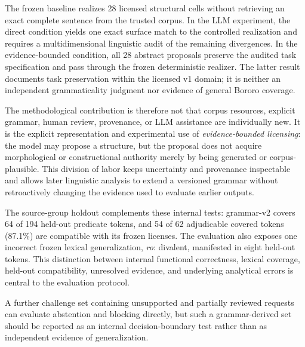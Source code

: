 \documentclass[11pt]{article}
\begin{document}
The frozen baseline realizes 28 licensed structural cells without retrieving an
exact complete sentence from the trusted corpus. In the LLM experiment, the
direct condition yields one exact surface match to the controlled realization
and requires a multidimensional linguistic audit of the remaining divergences.
In the evidence-bounded condition, all 28 abstract proposals preserve the
audited task specification and pass through the frozen deterministic realizer.
The latter result documents task preservation within the licensed v1 domain;
it is neither an independent grammaticality judgment nor evidence of general
Bororo coverage.

The methodological contribution is therefore not that corpus resources,
explicit grammar, human review, provenance, or LLM assistance are individually
new. It is the explicit representation and experimental use of
\emph{evidence-bounded licensing}: the model may propose a structure, but the
proposal does not acquire morphological or constructional authority merely by
being generated or corpus-plausible. This division of labor keeps uncertainty
and provenance inspectable and allows later linguistic analysis to extend a
versioned grammar without retroactively changing the evidence used to evaluate
earlier outputs.

The source-group holdout complements these internal tests: grammar-v2 covers
64 of 194 held-out predicate tokens, and 54 of 62 adjudicable covered tokens
(87.1\%) are compatible with its frozen licenses. The evaluation also exposes
one incorrect frozen lexical generalization, \textit{ro}: divalent, manifested
in eight held-out tokens. This distinction between internal functional
correctness, lexical coverage, held-out compatibility, unresolved evidence, and
underlying analytical errors is central to the evaluation protocol.

A further challenge set containing unsupported and partially reviewed requests
can evaluate abstention and blocking directly, but such a grammar-derived set
should be reported as an internal decision-boundary test rather than as
independent evidence of generalization.



\end{document}
